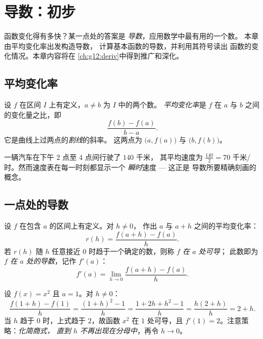 \chapter{导数：初步}\label{ch:g11:deriv}

函数变化得有多快？某一点处的答案是
\emph{导数}，应用数学中最有用的一个数。
本章由平均变化率出发构造导数，
计算基本函数的导数，并利用其符号读出
函数的变化情况。本章内容将在
\cref{ch:g12:deriv}中得到推广和深化。

\section{平均变化率}

\begin{definition}[平均变化率]\label{def:g11:deriv:rate}
设 $f$ 在区间 $I$ 上有定义，$a \neq b$ 为 $I$ 中的两个数。
\emph{平均变化率}是 $f$ 在
$a$ 与 $b$ 之间的变化量之比，即
\[
\frac{f(b) - f(a)}{b - a}.
\]
它是曲线上过两点的\emph{割线}的斜率。
这两点为 $\bigl(a, f(a)\bigr)$ 与 $\bigl(b, f(b)\bigr)$。
\end{definition}

\begin{example}
一辆汽车在下午 2 点至 4 点间行驶了 $140$ 千米，
其平均速度为 $\frac{140}{2} = 70$ 千米/时。然而速度表在每一时刻都显示一个
\emph{瞬时}速度 --- 这正是
导数所要精确刻画的概念。
\end{example}

\section{一点处的导数}

\begin{definition}[一点处的导数]\label{def:g11:deriv:derivative}
设 $f$ 在包含 $a$ 的区间上有定义。对 $h \neq 0$，
作出 $a$ 与 $a + h$ 之间的平均变化率：
\[
r(h) = \frac{f(a+h) - f(a)}{h}.
\]
若 $r(h)$ 随 $h$ 任意接近
$0$ 时趋于一个确定的数，则称 $f$ \emph{在 $a$ 处可导}；
此数即为\emph{$f$ 在 $a$ 处的导数}，记作 $f'(a)$：
\[
f'(a) = \lim_{h \to 0} \frac{f(a+h) - f(a)}{h}.
\]
\end{definition}

\begin{example}\label{ex:g11:deriv:atpoint}
设 $f(x) = x^2$ 且 $a = 1$。对 $h \neq 0$：
\[
\frac{f(1+h) - f(1)}{h}
= \frac{(1+h)^2 - 1}{h}
= \frac{1 + 2h + h^2 - 1}{h}
= \frac{h(2 + h)}{h}
= 2 + h .
\]
当 $h$ 趋于 $0$ 时，上式趋于 $2$，故函数 $x^2$
在 $1$ 处可导，且 $f'(1) = 2$。注意策略：\emph{化简商式，
直到 $h$ 不再出现在分母中}，再令
$h \to 0$。
\end{example}

